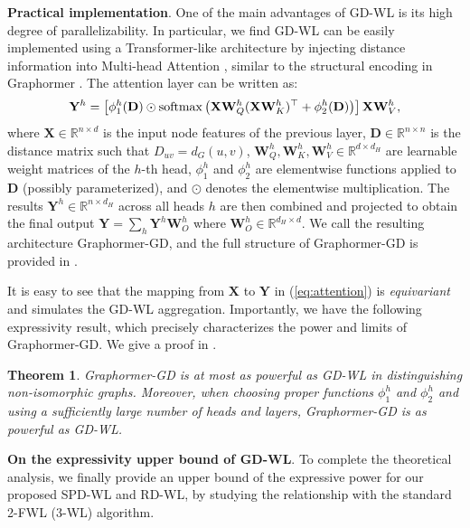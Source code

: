 \documentclass{article}
\let\cref\crtcref
\newtheorem{theorem}{Theorem}[section]
\begin{document}
\textbf{Practical implementation}. One of the main advantages of GD-WL is its high degree of parallelizability. In particular, we find GD-WL can be easily implemented using a Transformer-like architecture by injecting distance information into Multi-head Attention , similar to the structural encoding in Graphormer . The attention layer can be written as:
\begin{equation}
\setlength{\abovedisplayskip}{5pt}
\setlength{\belowdisplayskip}{5pt}
\label{eq:attention}
    \mathbf Y^h=\left[\phi_1^h(\mathbf D)\odot \operatorname{softmax}\left(\mathbf X\mathbf W^h_Q(\mathbf X\mathbf W^h_K)^\top+\mathbf \phi_2^h(\mathbf D)\right)\right]\mathbf X\mathbf W^h_V,
\end{equation}
where $\mathbf X\in\mathbb R^{n\times d}$ is the input node features of the previous layer, $\mathbf D\in\mathbb R^{n\times n}$ is the distance matrix such that $D_{uv}=d_G(u,v)$, $\mathbf W^h_Q,\mathbf W^h_K,\mathbf W^h_V\in\mathbb R^{d\times d_H}$ are learnable weight matrices of the $h$-th head, $\phi_1^h$ and $\phi_2^h$ are elementwise functions applied to $\mathbf D$ (possibly parameterized), and $\odot$ denotes the elementwise multiplication. The results $\mathbf Y^h\in\mathbb R^{n\times d_H}$ across all heads $h$ are then combined and projected to obtain the final output $\mathbf Y=\sum_h \mathbf Y^h\mathbf W_O^h$ where $\mathbf W_O^h\in\mathbb R^{d_H\times d}$. We call the resulting architecture Graphormer-GD, and the full structure of Graphormer-GD is provided in \cref{sec:transformer}.

It is easy to see that the mapping from $\mathbf X$ to $\mathbf Y$ in (\ref{eq:attention}) is \emph{equivariant} and simulates the GD-WL aggregation. Importantly, we have the following expressivity result, which precisely characterizes the power and limits of Graphormer-GD. We give a proof in \cref{sec:transformer}.
\begin{theorem}
\label{thm:Graphormer-GD-gdwl}
Graphormer-GD is at most as powerful as GD-WL in distinguishing non-isomorphic graphs. Moreover, when choosing proper functions $\phi_1^h$ and $\phi_2^h$ and using a sufficiently large number of heads and layers, Graphormer-GD is as powerful as GD-WL.
\end{theorem}

\textbf{On the expressivity upper bound of GD-WL}. To complete the theoretical analysis, we finally provide an upper bound of the expressive power for our proposed SPD-WL and RD-WL, by studying the relationship with the standard 2-FWL (3-WL) algorithm.
\end{document}
